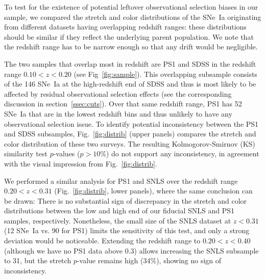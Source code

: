 \documentclass[]{aa}
\begin{document}
To test for the existence of potential leftover observational selection biases
in our sample, we compared the stretch and color distributions of the SNe~Ia
originating from different datasets having overlapping redshift ranges: these
distributions should be similar if they reflect the underlying parent
population. We note that the redshift range has to be narrow enough so that any
drift would be negligible.

The two samples that overlap most in redshift are PS1 and SDSS in the redshift
range $0.10 < z < 0.20$ (see Fig~\ref{fig:sample}). This overlapping subsample
consists of the 146 SNe~Ia at the high-redshift end of SDSS and thus is most
likely to be affected by residual observational selection effects (see the
corresponding discussion in section~\ref{ssec:cuts}). Over that same redshift
range, PS1 has 52 SNe~Ia that are in the lowest redshift bins and thus unlikely
to have any observational selection issue. To identify potential inconsistency
between the PS1 and SDSS subsamples, Fig.~\ref{fig:distrib} (upper panels)
compares the stretch and color distribution of these two surveys. The resulting
Kolmogorov-Smirnov (KS) similarity test $p$-values ($p >10\%$) do not support
any inconsistency, in agreement with the visual impression from
Fig.~\ref{fig:distrib}.

We performed a similar analysis for PS1 and SNLS over the redshift range $0.20 <
z < 0.31$ (Fig.~\ref{fig:distrib}, lower panels), where the same conclusion can
be drawn: There is no substantial sign of discrepancy in the stretch and color
distributions between the low and high end of our fiducial SNLS and PS1 samples,
respectively. Nonetheless, the small size of the SNLS dataset at $z < 0.31$ (12
SNe~Ia vs. 90 for PS1) limits the sensitivity of this test, and only a strong
deviation would be noticeable. Extending the redshift range to $0.20 < z < 0.40$
(although we have no PS1 data above 0.3) allows increasing the SNLS subsample to
31, but the stretch $p$-value remains high (34\%), showing no sign of
inconsistency.
\end{document}
